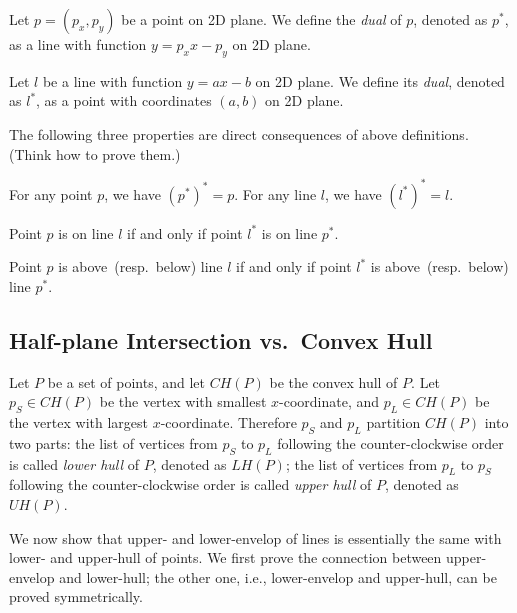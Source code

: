 \begin{definition}
Let $p = (p_x, p_y)$ be a point on 2D plane. We define the \emph{dual} of $p$, denoted as $p^*$, as
a line with function $y = p_x x - p_y$ on 2D plane.
\end{definition}

\begin{definition}
Let $l$ be a line with function $y = ax-b$ on 2D plane. We define its \emph{dual}, denoted as $l^*$,
as a point with coordinates $(a,b)$ on 2D plane.
\end{definition}

The following three properties are direct consequences of above definitions. (Think how to prove them.)

\begin{property}
For any point $p$, we have $(p^*)^* = p$. 
For any line $l$, we have $(l^*)^* = l$. 
\end{property}

\begin{property}
Point $p$ is on line $l$ if and only if point $l^*$ is on line $p^*$.
\end{property}

\begin{property}
Point $p$ is above~(resp.\ below) line $l$ if and only if point $l^*$ is above~(resp.\ below) line $p^*$.
\end{property}


\subsection*{Half-plane Intersection vs.\ Convex Hull}

\begin{definition}
Let $P$ be a set of points, and let $CH(P)$ be the convex hull of $P$.
Let $p_S\in CH(P)$ be the vertex with smallest $x$-coordinate,
and $p_L\in CH(P)$ be the vertex with largest $x$-coordinate.
Therefore $p_S$ and $p_L$ partition $CH(P)$ into two parts:
the list of vertices from $p_S$ to $p_L$ following the counter-clockwise order is called \emph{lower hull} of $P$, denoted as $LH(P)$;
the list of vertices from $p_L$ to $p_S$ following the counter-clockwise order is called \emph{upper hull} of $P$, denoted as $UH(P)$.
\end{definition}

We now show that upper- and lower-envelop of lines is essentially the same with lower- and upper-hull of points.
We first prove the connection between upper-envelop and lower-hull; the other one, i.e., lower-envelop and upper-hull, can be proved symmetrically.

